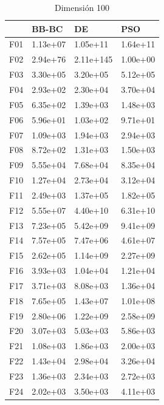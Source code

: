\begin{table}[H]
\begin{minipage}{.5\linewidth}
    \end{minipage}%
    \begin{minipage}{.5\linewidth}
      \centering
      \caption{Dimensión 100}
      \begin{tabular}{llll}
        \toprule
        {} &     BB-BC &         DE &       PSO \\
        \midrule
        F01  &  1.13e+07 &   1.05e+11 &  1.64e+11 \\
        F02  &  2.94e+76 &  2.11e+145 &  1.00e+00 \\
        F03  &  3.30e+05 &   3.20e+05 &  5.12e+05 \\
        F04  &  2.93e+02 &   2.30e+04 &  3.70e+04 \\
        F05  &  6.35e+02 &   1.39e+03 &  1.48e+03 \\
        F06  &  5.96e+01 &   1.03e+02 &  9.71e+01 \\
        F07  &  1.09e+03 &   1.94e+03 &  2.94e+03 \\
        F08  &  8.72e+02 &   1.31e+03 &  1.50e+03 \\
        F09  &  5.55e+04 &   7.68e+04 &  8.35e+04 \\
        F10  &  1.27e+04 &   2.73e+04 &  3.12e+04 \\
        F11  &  2.49e+03 &   1.37e+05 &  1.82e+05 \\
        F12  &  5.55e+07 &   4.40e+10 &  6.31e+10 \\
        F13  &  7.23e+05 &   5.42e+09 &  9.41e+09 \\
        F14  &  7.57e+05 &   7.47e+06 &  4.61e+07 \\
        F15  &  2.62e+05 &   1.14e+09 &  2.27e+09 \\
        F16  &  3.93e+03 &   1.04e+04 &  1.21e+04 \\
        F17  &  3.71e+03 &   8.08e+03 &  1.36e+04 \\
        F18  &  7.65e+05 &   1.43e+07 &  1.01e+08 \\
        F19  &  2.80e+06 &   1.22e+09 &  2.58e+09 \\
        F20  &  3.07e+03 &   5.03e+03 &  5.86e+03 \\
        F21  &  1.08e+03 &   1.86e+03 &  2.00e+03 \\
        F22  &  1.43e+04 &   2.98e+04 &  3.26e+04 \\
        F23  &  1.36e+03 &   2.34e+03 &  2.72e+03 \\
        F24  &  2.02e+03 &   3.50e+03 &  4.11e+03 \\

\end{tabular}
\end{minipage}
\end{table}
